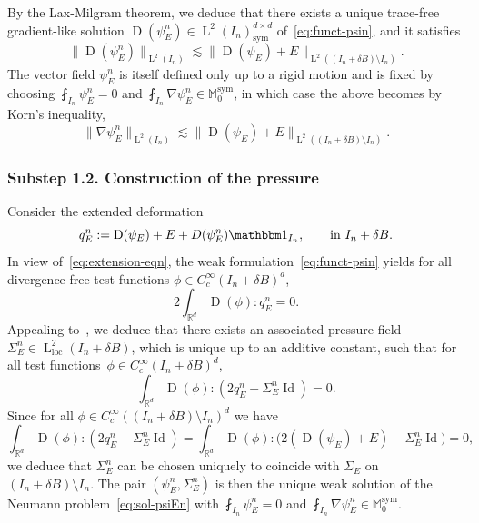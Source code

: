 \documentclass[10pt]{amsart}
\let\mathds\mathbbm
\theoremstyle{plain}
\theoremstyle{definition}
\newcommand{\R}{\mathbb R}
\newcommand{\Md}{\mathbb M}
\newcommand{\loc}{{\operatorname{loc}}}
\newcommand{\Id}{\operatorname{Id}}
\newcommand{\D}{\operatorname{D}}
\newcommand{\Ld}{\operatorname{L}}
\newcommand{\Sym}{{\operatorname{sym}}}
\newcommand{\substep}[1]{\subsubsection*{Substep #1}}
\begin{document}
By the Lax-Milgram theorem, we deduce that there exists a unique trace-free gradient-like solution $\D(\psi_E^{n})\in \Ld^2(I_n)^{d\times d}_\Sym$ of~\eqref{eq:funct-psin},
and it satisfies
\begin{equation*}
\|\!\D(\psi_E^{n})\|_{\Ld^2(I_n)}\lesssim \|\!\D(\psi_E)+E\|_{\Ld^2((I_n+\delta B)\setminus I_n)}.
\end{equation*}
The vector field $\psi_E^{n}$ is itself defined only up to a rigid motion and is fixed by choosing $\fint_{I_n}\psi_E^{n}=0$ and $\fint_{I_n}\nabla\psi_E^{n}\in\Md_0^\Sym$, in which case the above becomes by Korn's inequality,
\begin{equation}\label{eq:nabpsiEn}
\|\nabla\psi_E^{n}\|_{\Ld^2(I_n)}\lesssim \|\!\D(\psi_E)+E\|_{\Ld^2((I_n+\delta B)\setminus I_n)}.
\end{equation}

\substep{1.2. Construction of the pressure}
Consider the extended deformation
\[q_E^n:=\D(\psi_E)+E+D(\psi_E^n)\mathds1_{I_n},\qquad\text{in $I_n+\delta B$}.\]
In view of~\eqref{eq:extension-eqn}, the weak formulation~\eqref{eq:funct-psin} yields for all divergence-free test functions $\phi\in C^\infty_c(I_n+\delta B)^d$,
\[2\int_{\R^d}\D(\phi):q_E^n=0.\]
Appealing \eg to~\cite[Prop.\,12.10]{JKO94}, we deduce that there exists an associated pressure field $\Sigma_E^n\in\Ld^2_\loc(I_n+\delta B)$, which is unique up to an additive constant, such that for all test functions~$\phi\in C^\infty_c(I_n+\delta B)^d$,
\begin{equation}\label{eq:qtildeS}
\int_{\R^d}\D(\phi):(2q_E^n-\Sigma_E^n\Id)=0.
\end{equation}
Since for all $\phi\in C^\infty_c((I_n+\delta B)\setminus I_n)^d$ we have
\[\int_{\R^d}\D(\phi):(2q_E^n -\Sigma_E^n\Id)=\int_{\R^d}\D(\phi):\big(2(\D(\psi_E)+E)-\Sigma_E^n\Id\big)=0,\]
we deduce that $\Sigma_E^n$ can be chosen uniquely to coincide with $\Sigma_E$ on $(I_n+\delta B)\setminus I_n$.
The pair $(\psi_E^n,\Sigma_E^n)$ is then the unique weak solution of the Neumann problem~\eqref{eq:sol-psiEn} with $\fint_{I_n}\psi_E^{n}=0$ and $\fint_{I_n}\nabla\psi_E^{n}\in\Md^\Sym_0$.
\end{document}
